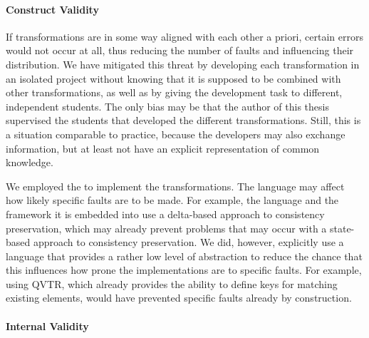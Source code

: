 \paragraph{Construct Validity}
If transformations are in some way aligned with each other a priori, certain errors would not occur at all, thus reducing the number of faults and influencing their distribution.
We have %
mitigated this threat by developing each transformation in an isolated project without knowing that it is supposed to be combined with other transformations, as well as by giving the development task to different, independent students.
The only bias may be that the author of this thesis supervised the students that developed the different transformations.
Still, this is a situation comparable to practice, because the developers may also exchange information, but at least not have an explicit representation of common knowledge.

We employed the \reactionslanguage to implement the transformations.
The language may affect how likely specific faults are to be made.
For example, the language and the \vitruv framework it is embedded into use a delta-based approach to consistency preservation, which may already prevent problems that may occur with a state-based approach to consistency preservation.
We did, however, explicitly use a language that provides a rather low level of abstraction to reduce the chance that this influences how prone the implementations are to specific faults.
For example, using \gls{QVTR}, which already provides the ability to define keys for matching existing elements, would have prevented specific faults already by construction.

\paragraph{Internal Validity}

